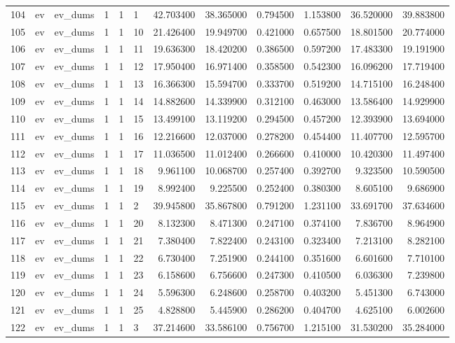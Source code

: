 \begin{tabular}{llllllrrrrrr}
104 & ev & ev_dums & 1 & 1 & 1 & 42.703400 & 38.365000 & 0.794500 & 1.153800 & 36.520000 & 39.883800 \\
105 & ev & ev_dums & 1 & 1 & 10 & 21.426400 & 19.949700 & 0.421000 & 0.657500 & 18.801500 & 20.774000 \\
106 & ev & ev_dums & 1 & 1 & 11 & 19.636300 & 18.420200 & 0.386500 & 0.597200 & 17.483300 & 19.191900 \\
107 & ev & ev_dums & 1 & 1 & 12 & 17.950400 & 16.971400 & 0.358500 & 0.542300 & 16.096200 & 17.719400 \\
108 & ev & ev_dums & 1 & 1 & 13 & 16.366300 & 15.594700 & 0.333700 & 0.519200 & 14.715100 & 16.248400 \\
109 & ev & ev_dums & 1 & 1 & 14 & 14.882600 & 14.339900 & 0.312100 & 0.463000 & 13.586400 & 14.929900 \\
110 & ev & ev_dums & 1 & 1 & 15 & 13.499100 & 13.119200 & 0.294500 & 0.457200 & 12.393900 & 13.694000 \\
111 & ev & ev_dums & 1 & 1 & 16 & 12.216600 & 12.037000 & 0.278200 & 0.454400 & 11.407700 & 12.595700 \\
112 & ev & ev_dums & 1 & 1 & 17 & 11.036500 & 11.012400 & 0.266600 & 0.410000 & 10.420300 & 11.497400 \\
113 & ev & ev_dums & 1 & 1 & 18 & 9.961100 & 10.068700 & 0.257400 & 0.392700 & 9.323500 & 10.590500 \\
114 & ev & ev_dums & 1 & 1 & 19 & 8.992400 & 9.225500 & 0.252400 & 0.380300 & 8.605100 & 9.686900 \\
115 & ev & ev_dums & 1 & 1 & 2 & 39.945800 & 35.867800 & 0.791200 & 1.231100 & 33.691700 & 37.634600 \\
116 & ev & ev_dums & 1 & 1 & 20 & 8.132300 & 8.471300 & 0.247100 & 0.374100 & 7.836700 & 8.964900 \\
117 & ev & ev_dums & 1 & 1 & 21 & 7.380400 & 7.822400 & 0.243100 & 0.323400 & 7.213100 & 8.282100 \\
118 & ev & ev_dums & 1 & 1 & 22 & 6.730400 & 7.251900 & 0.244100 & 0.351600 & 6.601600 & 7.710100 \\
119 & ev & ev_dums & 1 & 1 & 23 & 6.158600 & 6.756600 & 0.247300 & 0.410500 & 6.036300 & 7.239800 \\
120 & ev & ev_dums & 1 & 1 & 24 & 5.596300 & 6.248600 & 0.258700 & 0.403200 & 5.451300 & 6.743000 \\
121 & ev & ev_dums & 1 & 1 & 25 & 4.828800 & 5.445900 & 0.286200 & 0.404700 & 4.625100 & 6.002600 \\
122 & ev & ev_dums & 1 & 1 & 3 & 37.214600 & 33.586100 & 0.756700 & 1.215100 & 31.530200 & 35.284000 \\

\end{tabular}
